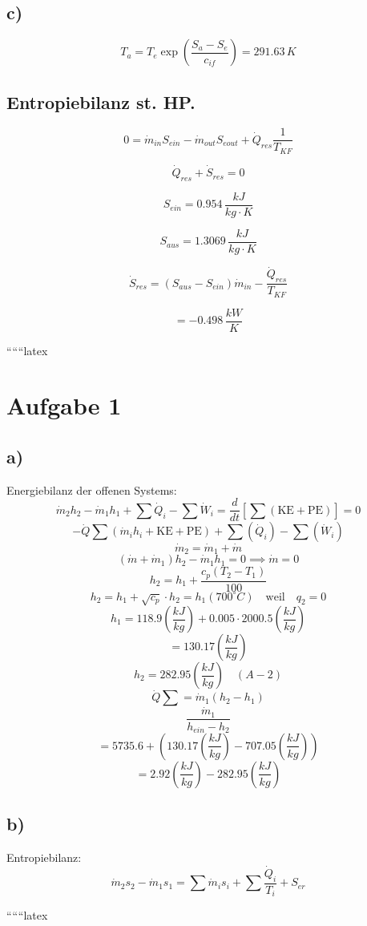 \subsection*{c)}
\[
T_a = T_e \exp \left( \frac{S_a - S_e}{c_{if}} \right) = 291.63 \, K
\]

\subsection*{Entropiebilanz st. HP.}
\[
0 = \dot{m}_{in} S_{ein} - \dot{m}_{out} S_{eout} + \dot{Q}_{res} \frac{1}{T_{KF}}
\]

\[
\dot{Q}_{res} + \dot{S}_{res} = 0
\]

\[
S_{ein} = 0.954 \, \frac{kJ}{kg \cdot K}
\]

\[
S_{aus} = 1.3069 \, \frac{kJ}{kg \cdot K}
\]

\[
\dot{S}_{res} = \left( S_{aus} - S_{ein} \right) \dot{m}_{in} - \frac{\dot{Q}_{res}}{T_{KF}}
\]

\[
= -0.498 \, \frac{kW}{K}
\]

``````latex


\section*{Aufgabe 1}

\subsection*{a)}
Energiebilanz der offenen Systems:
\[
\dot{m}_2 h_2 - \dot{m}_1 h_1 + \sum \dot{Q}_i - \sum \dot{W}_i = \frac{d}{dt} \left[ \sum \left( \text{KE} + \text{PE} \right) \right] = 0
\]
\[
- \dot{Q} \sum \left( \dot{m}_i h_i + \text{KE} + \text{PE} \right) + \sum \left( \dot{Q}_i \right) - \sum \left( \dot{W}_i \right)
\]
\[
\dot{m}_2 = \dot{m}_1 + \dot{m}
\]
\[
(\dot{m} + \dot{m}_1) h_2 - \dot{m}_1 h_1 = 0 \implies \dot{m} = 0
\]
\[
h_2 = h_1 + \frac{c_p (T_2 - T_1)}{100}
\]
\[
h_2 = h_1 + \sqrt{c_p} \cdot h_2 = h_1 (700^\circ C) \quad \text{weil} \quad q_2 = 0
\]
\[
h_1 = 118.9 \left( \frac{kJ}{kg} \right) + 0.005 \cdot 2000.5 \left( \frac{kJ}{kg} \right)
\]
\[
= 130.17 \left( \frac{kJ}{kg} \right)
\]
\[
h_2 = 282.95 \left( \frac{kJ}{kg} \right) \quad (A-2)
\]
\[
\dot{Q} \sum = \dot{m}_1 (h_2 - h_1)
\]
\[
\frac{\dot{m}_1}{h_{ein} - h_2}
\]
\[
= 5735.6 + (130.17 \left( \frac{kJ}{kg} \right) - 707.05 \left( \frac{kJ}{kg} \right))
\]
\[
= 2.92 \left( \frac{kJ}{kg} \right) - 282.95 \left( \frac{kJ}{kg} \right)
\]

\subsection*{b)}
Entropiebilanz:
\[
\dot{m}_2 s_2 - \dot{m}_1 s_1 = \sum \dot{m}_i s_i + \sum \frac{\dot{Q}_i}{T_i} + S_{er}
\]

``````latex



